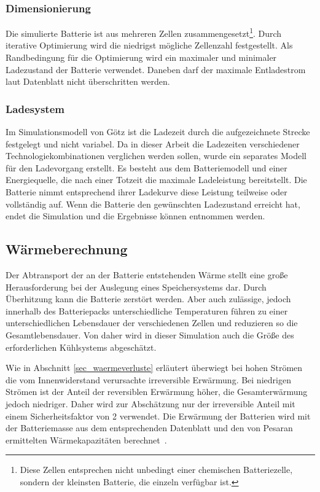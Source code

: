 \subsubsection{Dimensionierung}
Die simulierte Batterie ist aus mehreren Zellen zusammengesetzt\footnote{Diese Zellen entsprechen nicht unbedingt einer chemischen Batteriezelle, sondern der kleinsten Batterie, die einzeln verfügbar ist.}. Durch iterative Optimierung wird die niedrigst mögliche Zellenzahl festgestellt. Als Randbedingung für die Optimierung wird ein maximaler und minimaler Ladezustand der Batterie verwendet. Daneben darf der maximale Entladestrom laut Datenblatt nicht überschritten werden.

\subsubsection{Ladesystem}
Im Simulationsmodell von Götz ist die Ladezeit durch die aufgezeichnete Strecke festgelegt und nicht variabel. Da in dieser Arbeit die Ladezeiten verschiedener Technologiekombinationen verglichen werden sollen, wurde ein separates Modell für den Ladevorgang erstellt. Es besteht aus dem Batteriemodell und einer Energiequelle, die nach einer Totzeit die maximale Ladeleistung bereitstellt. Die Batterie nimmt entsprechend ihrer Ladekurve diese Leistung teilweise oder vollständig auf. Wenn die Batterie den gewünschten Ladezustand erreicht hat, endet die Simulation und die Ergebnisse können entnommen werden.

\subsection{Wärmeberechnung}
Der Abtransport der an der Batterie entstehenden Wärme stellt eine große Herausforderung bei der Auslegung eines Speichersystems dar. Durch Überhitzung kann die Batterie zerstört werden. Aber auch zulässige, jedoch innerhalb des Batteriepacks unterschiedliche Temperaturen führen zu einer unterschiedlichen Lebensdauer der verschiedenen Zellen und reduzieren so die Gesamtlebensdauer. Von daher wird in dieser Simulation auch die Größe des erforderlichen Kühlsystems abgeschätzt.

Wie in Abschnitt \ref{sec_waermeverluste} erläutert überwiegt bei hohen Strömen die vom Innenwiderstand verursachte irreversible Erwärmung. Bei niedrigen Strömen ist der Anteil der reversiblen Erwärmung höher, die Gesamterwärmung jedoch niedriger. Daher wird zur Abschätzung nur der irreversible Anteil mit einem Sicherheitsfaktor von 2 verwendet. Die Erwärmung der Batterien wird mit der Batteriemasse aus dem entsprechenden Datenblatt und den von Pesaran ermittelten Wärmekapazitäten berechnet~\cite{pesaran2001battery}.

